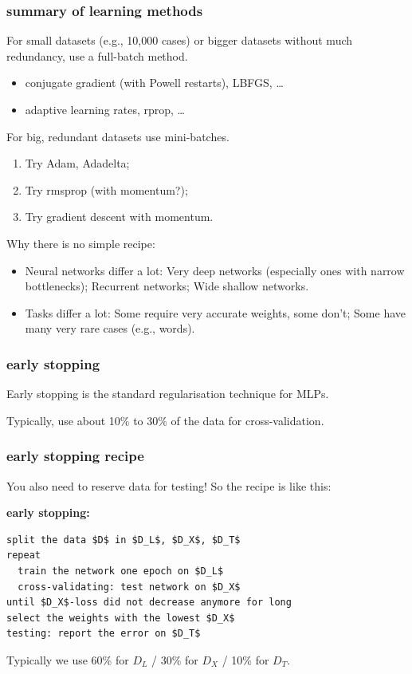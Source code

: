 \documentclass[USenglish,pdftex,compress,10pt,svgnamesi,handout]{beamer}
\begin{document}
\begin{frame}
\frametitle{summary of learning methods}
For small datasets (e.g., 10,000 cases) or bigger datasets without much redundancy,
use a full-batch method.
\begin{itemize}
\item conjugate gradient (with Powell restarts), LBFGS, \dots
\item adaptive learning rates, rprop, \dots
\end{itemize}
 For big, redundant datasets use mini-batches.
\begin{enumerate}
\item Try Adam, Adadelta;
\item Try rmsprop (with momentum?);
\item Try gradient descent with momentum.
\end{enumerate}
Why there is no simple recipe:
\begin{itemize}
\item Neural networks differ a lot:  Very deep networks (especially ones with narrow bottlenecks);
  Recurrent networks;  Wide shallow networks. 
\item Tasks differ a lot:
  Some require very accurate weights, some don't;
  Some have many very rare cases (e.g., words).
  \end{itemize}
  \end{frame}



\begin{frame}
\frametitle{early stopping}
Early stopping is the standard regularisation technique for MLPs. 

\vskip5mm
\centerline{}
\vskip5mm

 Typically, use about 10\% to 30\% of the data for cross-validation. 

\end{frame}
\begin{frame}[fragile]
\frametitle{early stopping recipe}
 You also need to reserve data for testing!  So the recipe is like this:
\vskip5mm

\begin{beamerboxesrounded}[upper=def,lower=block body,width=1.03\textwidth,shadow]{\textbf{early stopping:}}
\begin{lstlisting}[mathescape]
split the data $D$ in $D_L$, $D_X$, $D_T$
repeat
  train the network one epoch on $D_L$
  cross-validating: test network on $D_X$
until $D_X$-loss did not decrease anymore for long 
select the weights with the lowest $D_X$
testing: report the error on $D_T$
\end{lstlisting}
\end{beamerboxesrounded}

Typically we use  
 60\% for $D_L$ /
 30\% for $D_X$ /
 10\% for $D_T$.
\end{frame}
\end{document}
